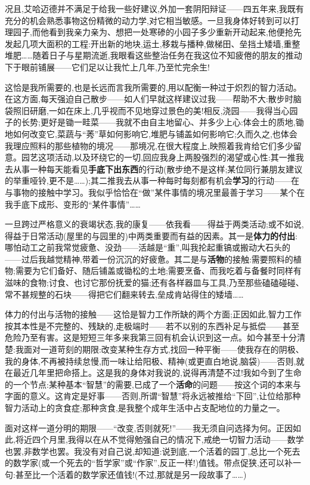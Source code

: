 况且,艾哈迈德并不满足于给我一些好建议,外加一套阴阳辩证——四五年来,我既有充分的机会熟悉事物这份精微的动力学,对它相当敏感。一旦我身体好转到可以打理园子,\dmark{}而他看到我亲力亲为、想把一处寒碜的小园子多少重新开动起来,他便抢先发起几项大面积的工程:开出新的地块,运土,移栽与播种,做梯田、垒挡土矮墙,重整堆肥……随着日子与星期流逝,我眼看这些整治任务在我这位不知疲倦的朋友的推动下于眼前铺展——它们足以让我忙上几年,乃至忙完余生!

这恰是我所需要的,也是长远而言我所需要的,用以配衡一种过于炽烈的智力活动。在这方面,每天强迫自己散步——如人们早就这样建议过我——帮助不大:散步时脑袋照旧研磨,一如在床上,几乎视而不见地穿过景色的美!相反,浇园——我得当心园子的长势;更好是锄一畦菜——我就不由自主地留心、并多少上心:体会土的质地,锄地如何改变它,菜蔬与“莠”草如何影响它,堆肥与铺盖如何影响它;久而久之,也体会我理应照料的那些植物的境况——那境况,在很大程度上,映照着我肯给它们多少留意。园艺这项活动,以及环绕它的一切,回应我身上两股强烈的渴望或心性:其一推我去从事一种每天能看见\textbf{手底下出东西}的行动(散步绝不是这样;某位同行兼朋友建议的举重哑铃,更不是……);其二推我去从事一种每时每刻都有机会\textbf{学习}的行动——在与事物的接触中学习。我似乎恰恰在“做”某件事情的境况里最善于学习——某个在我手底下成形、变形的“某件事情”……

一旦跨过严格意义的衰竭状态,我的康复——依我看——得益于两类活动;或不如说,得益于日常活动(屋里的与园里的)中两类重要而有益的因素。其一是\textbf{体力的付出}:哪怕动工之前我常觉疲惫、没劲——活越是“重”,叫我抡起\dmark{}重镐或搬动大石头的——过后我越觉精神,带着一份沉沉的好疲惫。其二是与\textbf{活物}的接触:需要照料的植物;需要为它们备好、随后铺盖或锄松的土地;需要烹备、而我吃着与备餐时同样有滋味的食物;讨食、也讨它那份抚爱的猫;还有各样器皿与工具,乃至那些磕磕碰碰、常不甚规整的石块——得把它们翻来转去,垒成肯站得住的矮墙……

体力的付出与活物的接触——这恰是智力工作所缺的两个方面;正因如此,智力工作按其本性是不完整的、残缺的,走极端时——若不以别的东西补足与抵偿——甚至危险乃至有害。这是短短三年多来我第三回有机会认识到这一点。如今甚至十分清楚:我面对一道苛刻的期限:改变某种生存方式,找回一种平衡——使我存在的阴极、我的身体,不再被持续怠慢,而一味让给阳极、精神(或更直白地说,脑袋)——否则,就在最近几年里把命搭上。这是我的身体对我说的,说得再清楚不过!我如今到了生命的一个节点:某种基本“智慧”的需要,已成了一个\textbf{活命}的问题——按这个词的本来与字面的意义。这肯定是好事——否则,所谓“智慧”将永远被推给“下回”,让位给那种智力活动上的贪食症;那种贪食,是我整个成年生活中占支配地位的力量之一。

面对这样一道分明的期限——“改变,否则就死!”——我无须自问选择为何。正因如此,将近四个月里,我得以在从不觉得勉强自己的情况下,戒绝一切智力活动——数学也罢,非数学也罢。我没有对自己说,却知道:说到底,一个活着的园丁,总比一个死去的数学家(或一个死去的“哲学家”或“作家”,反正一样!)值钱。带点促狭,还可以补一句:甚至比一个活着的数学家还值钱!(不过,那就是另一段故事了……)

